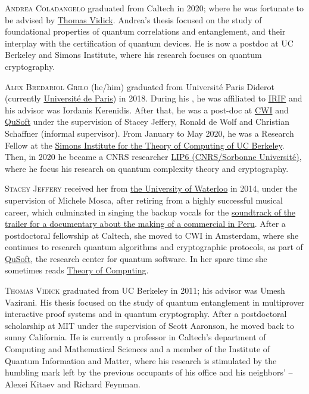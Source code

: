 \begin{tocaboutauthors}
\begin{tocabout}[coladangelo]  %
  \textsc{Andrea Coladangelo} graduated from Caltech in
  2020; where he was fortunate to be advised by
  \href{http://cms.caltech.edu/~vidick}{Thomas Vidick}. Andrea's thesis focused on the study of foundational properties of quantum correlations and entanglement, and their interplay with the certification of quantum devices. He is now a postdoc at UC Berkeley and Simons Institute, where his research focuses on quantum cryptography. 
\end{tocabout}
\begin{tocabout}[grilo]
\textsc{Alex Bredariol Grilo} (he/him) graduated from   Universit\'{e} Paris Diderot (currently   \href{https://u-paris.fr/en/}{Universit\'e de Paris}) in 2018. During his \phd{}, he was affiliated to  \href{https://www.irif.fr}{IRIF} and his advisor was Iordanis Kerenidis. After that, he was a post-doc at \href{https://cwi.nl}{CWI} and \href{https://qusoft.nl}{QuSoft} under the supervision of Stacey Jeffery, Ronald de Wolf and Christian Schaffner (informal supervisor). From January to May 2020, he was a Research Fellow at the \href{https://simons.berkeley.edu/}{Simons Institute for the Theory of Computing of UC Berkeley}. Then, in 2020 he became a CNRS researcher  \href{https://lip6.fr}{LIP6 (CNRS/Sorbonne Universit\'e)}, where he focus his research on quantum complexity theory and cryptography.
\end{tocabout}
\begin{tocabout}[jeffery]  %
  \textsc{Stacey Jeffery}
  received her \phd{} from 
  \href{http://uwaterloo.ca}{the University of Waterloo} in
  2014, under the supervision of Michele Mosca, after retiring from a highly successful musical career, which culminated in singing the backup vocals for the \href{https://www.youtube.com/watch?v=S15lHGMdubI}{soundtrack of the trailer for a documentary about the making of a commercial in Peru}. After a postdoctoral fellowship at Caltech, she moved to CWI in Amsterdam, where she continues to research quantum algorithms and cryptographic protocols, as part of \href{http://qusoft.org}{QuSoft}, the research center for quantum software.     In her spare time she sometimes reads
  \href{http://theoryofcomputing.org}{\textsf{Theory of Computing}}.
\end{tocabout}
\begin{tocabout}[vidick]
\textsc{Thomas Vidick} graduated from UC Berkeley in 2011; his advisor was Umesh Vazirani. His thesis focused on the study of quantum entanglement in multiprover interactive proof systems and in quantum cryptography. After a postdoctoral scholarship at MIT under the supervision of Scott Aaronson, he moved back to sunny California. He is currently a professor in Caltech's department of Computing and Mathematical Sciences and a member of the Institute of Quantum Information and Matter, where his research is stimulated by the humbling mark left by the previous occupants of his office and his neighbors' -- Alexei Kitaev and Richard Feynman.
\end{tocabout}
\end{tocaboutauthors}




